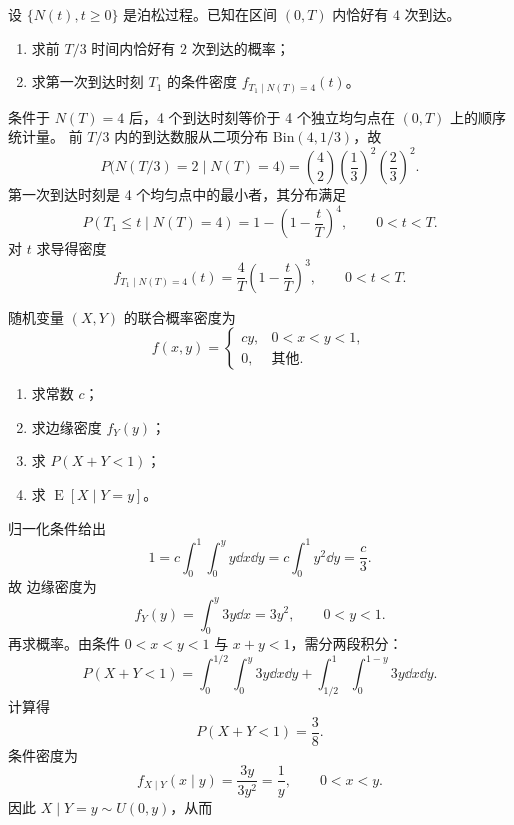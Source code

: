 \begin{question}
设 $\{N(t),t\ge 0\}$ 是泊松过程。已知在区间 $(0,T)$ 内恰好有 $4$ 次到达。
\begin{enumerate}[label=(\alph*),leftmargin=2.8em,itemsep=0.2em]
\item 求前 $T/3$ 时间内恰好有 $2$ 次到达的概率；
\item 求第一次到达时刻 $T_1$ 的条件密度 $f_{T_1\mid N(T)=4}(t)$。
\end{enumerate}
\begin{solution}
条件于 $N(T)=4$ 后，4 个到达时刻等价于 4 个独立均匀点在 $(0,T)$ 上的顺序统计量。
前 $T/3$ 内的到达数服从二项分布 $\mathrm{Bin}(4,1/3)$，故
\[
P\bigl(N(T/3)=2\mid N(T)=4\bigr)=\binom42\left(\frac13\right)^2\left(\frac23\right)^2.
\]
第一次到达时刻是 4 个均匀点中的最小者，其分布满足
\[
P(T_1\leq t\mid N(T)=4)=1-\left(1-\frac{t}{T}\right)^4,
\qquad 0<t<T.
\]
对 $t$ 求导得密度
\[
f_{T_1\mid N(T)=4}(t)=\frac{4}{T}\left(1-\frac{t}{T}\right)^3,
\qquad 0<t<T.
\]
\end{solution}
\end{question}

\begin{question}
随机变量 $(X,Y)$ 的联合概率密度为
\[
f(x,y)=\begin{cases}
cy,&0<x<y<1,\\
0,&\text{其他}.
\end{cases}
\]
\begin{enumerate}[label=(\alph*),leftmargin=2.8em,itemsep=0.2em]
\item 求常数 $c$；
\item 求边缘密度 $f_Y(y)$；
\item 求 $P(X+Y<1)$；
\item 求 $\operatorname{E}[X\mid Y=y]$。
\end{enumerate}
\begin{solution}
归一化条件给出
\[
1=c\int_0^1\int_0^y y\dd{x}\dd{y}=c\int_0^1 y^2\dd{y}=\frac{c}{3}.
\]
故
边缘密度为
\[
f_Y(y)=\int_0^y 3y\dd{x}=3y^2,
\qquad 0<y<1.
\]
再求概率。由条件 $0<x<y<1$ 与 $x+y<1$，需分两段积分：
\[
P(X+Y<1)=\int_0^{1/2}\int_0^y 3y\dd{x}\dd{y}+\int_{1/2}^{1}\int_0^{1-y}3y\dd{x}\dd{y}.
\]
计算得
\[
P(X+Y<1)=\frac38.
\]
条件密度为
\[
f_{X\mid Y}(x\mid y)=\frac{3y}{3y^2}=\frac1y,
\qquad 0<x<y.
\]
因此 $X\mid Y=y\sim U(0,y)$，从而
\end{solution}
\end{question}


